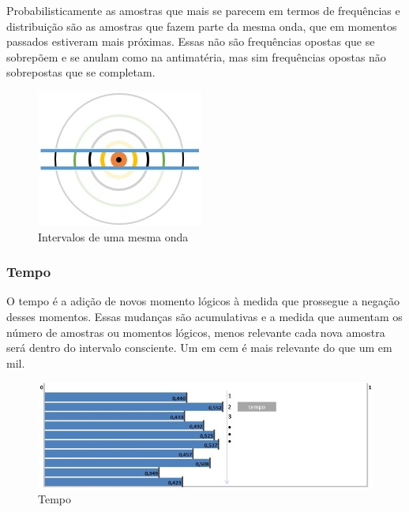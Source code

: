 Probabilisticamente as amostras que mais se parecem em termos de frequências e distribuição são as amostras que fazem parte da mesma onda, que em momentos passados estiveram mais próximas. Essas não são frequências opostas que se sobrepõem e se anulam como na antimatéria, mas sim frequências opostas não sobrepostas que se completam.

\begin{figure}[H]
\caption{Intervalos de uma mesma onda}
\label{fig:consciousness_coexistence_waves}
\centering
\includegraphics[scale=1]{sections/images/consciousness_coexistence_waves.jpg}
\end{figure}

\subsubsection{Tempo}
O tempo é a adição de novos momento lógicos à medida que prossegue a negação desses momentos.  Essas mudanças são acumulativas e a medida que aumentam os número de amostras ou momentos lógicos, menos relevante cada nova amostra será dentro do intervalo consciente. Um em cem é mais relevante do que um em mil. 

\begin{figure}[H]
\caption{Tempo}
\label{fig:consciousness_time}
\centering
\includegraphics[scale=.8]{sections/images/consciousness_time.jpg}
\end{figure}

